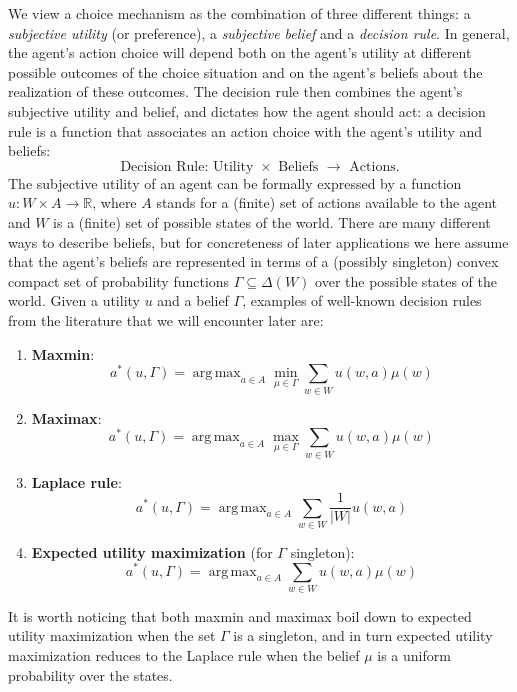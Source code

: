 \documentclass[fleqn,reqno,12pt]{article}
\theoremstyle{Satz}
\theoremstyle{Bsp}
\DeclareMathOperator*{\argmax}{arg\,max}
\begin{document}
We view a choice mechanism as the combination of three different things: a \textit{subjective
  utility} (or preference), a \textit{subjective belief} and a \textit{decision rule}. In
general, the agent's action choice will depend both on the agent's utility at different
possible outcomes of the choice situation and on the agent's beliefs about the realization of
these outcomes. The decision rule then combines the agent's subjective utility and belief, and
dictates how the agent should act: a decision rule is a function that associates an action
choice with the agent's utility and beliefs:
$$ \text{Decision Rule: Utility }\times\text{ Beliefs } \rightarrow \text{ Actions.}  $$
The subjective utility of an agent can be formally expressed by a function
$u:W \times A \rightarrow \mathbb{R} $, where $A$ stands for a (finite) set of actions
available to the agent and $W$ is a (finite) set of possible states of the world. There are
many different ways to describe beliefs, but for concreteness of later applications we here
assume that the agent's beliefs are represented in terms of a (possibly singleton) convex compact set of
probability functions $\Gamma \subseteq \Delta(W) $ over the possible states of the
world. Given a utility $u$ and a belief $\Gamma$, examples of well-known decision rules from the literature that we will encounter later are:
\begin{enumerate}

\item \textbf{Maxmin}: $$ a^*(u,\Gamma)= \argmax_{a \in A} \min_{\mu \in \Gamma} \sum_{w\in W} u(w,a)  \mu(w)$$

\item \textbf{Maximax}: $$ a^*(u,\Gamma)= \argmax_{a \in A} \max_{\mu \in \Gamma} \sum_{w\in W} u(w,a)  \mu(w)$$

\item \textbf{Laplace rule}: $$ a^*(u,\Gamma)= \argmax_{a \in A} \sum_{w\in W} \frac{1}{|W|}  u(w,a) $$

\item \textbf{Expected utility maximization} (for $\Gamma$ singleton): $$ a^*(u,\Gamma)= \argmax_{a \in A} \sum_{w\in W} u(w,a)  \mu(w)$$

\end{enumerate}

It is worth noticing that both maxmin and maximax boil down to expected utility maximization
when the set $\Gamma$ is a singleton, and in turn expected utility maximization reduces to the
Laplace rule when the belief $\mu$ is a uniform probability over the states.
\end{document}
